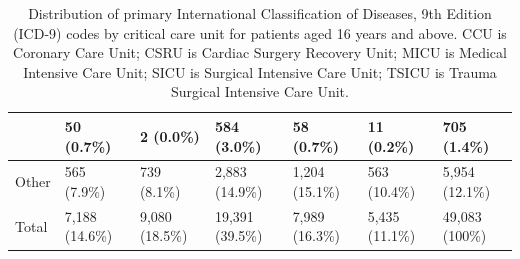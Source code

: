 \documentclass[english]{article}
\begin{document}
\begin{center}
\begin{table}
\begin{tabular}{|p{4.0cm}|p{1.25cm}|p{1.25cm}|p{1.25cm}|p{1.25cm}|p{1.25cm}|p{1.25cm}|}
    & 50 (0.7\%) & 2 (0.0\%) & 584 (3.0\%) & 58 (0.7\%) & 11 (0.2\%) & 705 (1.4\%) \\
    \hline
    Other & 565 (7.9\%) & 739 (8.1\%) & 2,883 (14.9\%) & 1,204 (15.1\%) & 563 (10.4\%) & 5,954 (12.1\%) \\
    \hline
    Total & 7,188 (14.6\%) & 9,080 (18.5\%) & 19,391 (39.5\%) & 7,989 (16.3\%) & 5,435 (11.1\%) & 49,083 (100\%) \\
    \hline
\end{tabular}
\caption{Distribution of primary International Classification of Diseases, 9th Edition (ICD-9) codes by critical care unit for patients aged 16 years and above. CCU is Coronary Care Unit; CSRU is Cardiac Surgery Recovery Unit; MICU is Medical Intensive Care Unit; SICU is Surgical Intensive Care Unit; TSICU is Trauma Surgical Intensive Care Unit.}
\label{table:icddistribution}
\end{table}
\end{center}

\end{document}

